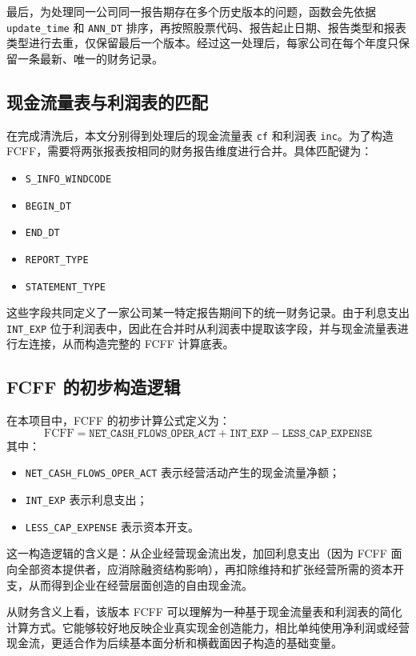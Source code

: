 \documentclass[a4paper,10pt]{article}
\begin{document}
最后，为处理同一公司同一报告期存在多个历史版本的问题，函数会先依据 \texttt{update\_time} 和 \texttt{ANN\_DT} 排序，再按照股票代码、报告起止日期、报告类型和报表类型进行去重，仅保留最后一个版本。经过这一处理后，每家公司在每个年度只保留一条最新、唯一的财务记录。

\subsection{现金流量表与利润表的匹配}
在完成清洗后，本文分别得到处理后的现金流量表 \texttt{cf} 和利润表 \texttt{inc}。为了构造 FCFF，需要将两张报表按相同的财务报告维度进行合并。具体匹配键为：
\begin{itemize}
    \item \texttt{S\_INFO\_WINDCODE}
    \item \texttt{BEGIN\_DT}
    \item \texttt{END\_DT}
    \item \texttt{REPORT\_TYPE}
    \item \texttt{STATEMENT\_TYPE}
\end{itemize}

这些字段共同定义了一家公司某一特定报告期间下的统一财务记录。由于利息支出 \texttt{INT\_EXP} 位于利润表中，因此在合并时从利润表中提取该字段，并与现金流量表进行左连接，从而构造完整的 FCFF 计算底表。

\subsection{FCFF 的初步构造逻辑}
在本项目中，FCFF 的初步计算公式定义为：
\begin{equation}
    \text{FCFF} = \texttt{NET\_CASH\_FLOWS\_OPER\_ACT} + \texttt{INT\_EXP} - \texttt{LESS\_CAP\_EXPENSE}
\end{equation}
其中：
\begin{itemize}
    \item \texttt{NET\_CASH\_FLOWS\_OPER\_ACT} 表示经营活动产生的现金流量净额；
    \item \texttt{INT\_EXP} 表示利息支出；
    \item \texttt{LESS\_CAP\_EXPENSE} 表示资本开支。
\end{itemize}

这一构造逻辑的含义是：从企业经营现金流出发，加回利息支出（因为 FCFF 面向全部资本提供者，应消除融资结构影响），再扣除维持和扩张经营所需的资本开支，从而得到企业在经营层面创造的自由现金流。

从财务含义上看，该版本 FCFF 可以理解为一种基于现金流量表和利润表的简化计算方式。它能够较好地反映企业真实现金创造能力，相比单纯使用净利润或经营现金流，更适合作为后续基本面分析和横截面因子构造的基础变量。
\end{document}
